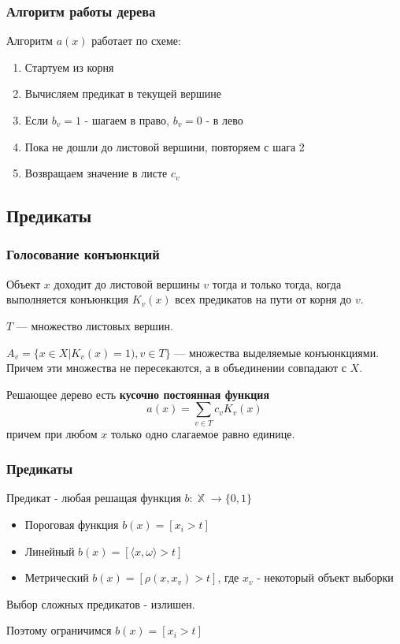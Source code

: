 \documentclass{beamer}
\DeclareMathOperator{\X}{\mathbb{X}}
\begin{document}
	\begin{frame}
		\frametitle{Алгоритм работы дерева}

		Алгоритм $a(x)$ работает по схеме:
		\begin{enumerate}
			\item Стартуем из корня
			\item Вычисляем предикат в текущей вершине
			\item Если $b_v = 1$ - шагаем в право, $b_v = 0$ - в лево
			\item Пока не дошли до листовой вершини, повторяем с шага 2
			\item Возвращаем значение в листе $c_v$
		\end{enumerate}
	\end{frame}

	\subsection{Предикаты}

	\begin{frame}
		\frametitle{Голосование конъюнкций}
	
		Объект $x$ доходит до листовой вершины $v$ тогда и только тогда, когда выполняется конъюнкция
		$K_v(x)$ всех предикатов на пути от корня до $v$.

		\vspace{15pt}

		$T$ --- множество листовых вершин. 
		
		$A_v = \{x \in X | K_v(x) = 1), v \in T\}$ --- множества выделяемые конъюнкциями.
		Причем эти множества не пересекаются, а в объединении совпадают с $X$.
		
		\vspace{15pt}

		Решающее дерево есть \textbf{кусочно постоянная функция}
		\[
		a(x) = \sum_{v \in T} c_v K_v(x)
		\]
		причем при любом $x$ только одно слагаемое равно единице.
	\end{frame}

	\begin{frame}
		\frametitle{Предикаты}

		Предикат - любая решащая функция $b :\X \rightarrow \{0, 1\}$
		
		\vspace{15pt}

		\begin{itemize}
			\item Пороговая функция $b(x) = [x_i > t]$
			\item Линейный $b(x) = [\langle x, \omega \rangle > t]$
			\item Метрический $b(x) = [\rho(x, x_v) > t]$, где $x_v$ - некоторый объект выборки
		\end{itemize}

		\vspace{15pt}

		Выбор сложных предикатов - излишен. 
		
		Поэтому ограничимся $b(x) = [x_i > t]$
	\end{frame}
\end{document}
